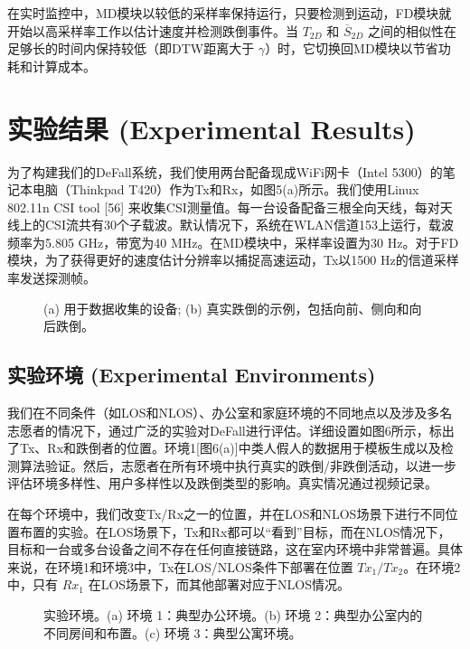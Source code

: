 \documentclass[journal]{IEEEtran}
\begin{document}
在实时监控中，MD模块以较低的采样率保持运行，只要检测到运动，FD模块就开始以高采样率工作以估计速度并检测跌倒事件。当 $T_{2D}$ 和 $\overline{S}_{2D}$ 之间的相似性在足够长的时间内保持较低（即DTW距离大于 $\gamma$）时，它切换回MD模块以节省功耗和计算成本。

\section{实验结果 (Experimental Results)}
为了构建我们的DeFall系统，我们使用两台配备现成WiFi网卡（Intel 5300）的笔记本电脑（Thinkpad T420）作为Tx和Rx，如图5(a)所示。我们使用Linux 802.11n CSI tool [56] 来收集CSI测量值。每一台设备配备三根全向天线，每对天线上的CSI流共有30个子载波。默认情况下，系统在WLAN信道153上运行，载波频率为5.805 GHz，带宽为40 MHz。在MD模块中，采样率设置为30 Hz。对于FD模块，为了获得更好的速度估计分辨率以捕捉高速运动，Tx以1500 Hz的信道采样率发送探测帧。

\begin{figure}[htbp]
\centering
\vspace{3cm} %
\caption{(a) 用于数据收集的设备; (b) 真实跌倒的示例，包括向前、侧向和向后跌倒。}
\end{figure}

\subsection{实验环境 (Experimental Environments)}
我们在不同条件（如LOS和NLOS）、办公室和家庭环境的不同地点以及涉及多名志愿者的情况下，通过广泛的实验对DeFall进行评估。详细设置如图6所示，标出了Tx、Rx和跌倒者的位置。环境1[图6(a)]中类人假人的数据用于模板生成以及检测算法验证。然后，志愿者在所有环境中执行真实的跌倒/非跌倒活动，以进一步评估环境多样性、用户多样性以及跌倒类型的影响。真实情况通过视频记录。

在每个环境中，我们改变Tx/Rx之一的位置，并在LOS和NLOS场景下进行不同位置布置的实验。在LOS场景下，Tx和Rx都可以“看到”目标，而在NLOS情况下，目标和一台或多台设备之间不存在任何直接链路，这在室内环境中非常普遍。具体来说，在环境1和环境3中，Tx在LOS/NLOS条件下部署在位置 $Tx_1/Tx_2$。在环境2中，只有 $Rx_1$ 在LOS场景下，而其他部署对应于NLOS情况。

\begin{figure}[htbp]
\centering
\vspace{5cm} %
\caption{实验环境。(a) 环境 1：典型办公环境。(b) 环境 2：典型办公室内的不同房间和布置。(c) 环境 3：典型公寓环境。}
\end{figure}
\end{document}
